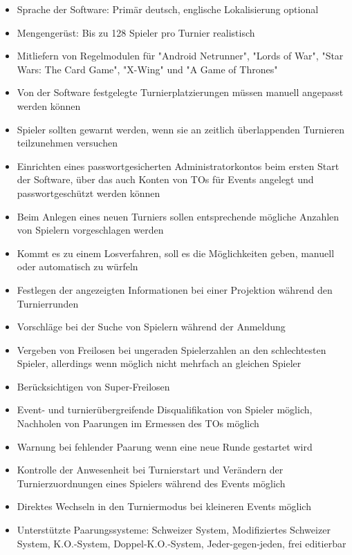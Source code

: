 \documentclass[11pt]{article}
\begin{document}
\begin{itemize}
	\item Sprache der Software: Primär deutsch, englische Lokalisierung optional
	\item Mengengerüst: Bis zu 128 Spieler pro Turnier realistisch
	\item Mitliefern von Regelmodulen für "Android Netrunner", "Lords of War", "Star Wars: The Card Game", "X-Wing" und "A Game of Thrones"
	\item Von der Software festgelegte Turnierplatzierungen müssen manuell angepasst werden können
	\item Spieler sollten gewarnt werden, wenn sie an zeitlich überlappenden Turnieren teilzunehmen versuchen
	\item Einrichten eines passwortgesicherten Administratorkontos beim ersten Start der Software, über das auch Konten von TOs für Events angelegt und passwortgeschützt werden können
	\item Beim Anlegen eines neuen Turniers sollen entsprechende mögliche Anzahlen von Spielern vorgeschlagen werden
	\item Kommt es zu einem Losverfahren, soll es die Möglichkeiten geben, manuell oder automatisch zu würfeln
	\item Festlegen der angezeigten Informationen bei einer Projektion während den Turnierrunden
	\item Vorschläge bei der Suche von Spielern während der Anmeldung
	\item Vergeben von Freilosen bei ungeraden Spielerzahlen an den schlechtesten Spieler, allerdings wenn möglich nicht mehrfach an gleichen Spieler
	\item Berücksichtigen von Super-Freilosen
	\item Event- und turnierübergreifende Disqualifikation von Spieler möglich, Nachholen von Paarungen im Ermessen des TOs möglich
	\item Warnung bei fehlender Paarung wenn eine neue Runde gestartet wird
	\item Kontrolle der Anwesenheit bei Turnierstart und Verändern der Turnierzuordnungen eines Spielers während des Events möglich
	\item Direktes Wechseln in den Turniermodus bei kleineren Events möglich
	\item Unterstützte Paarungssysteme: Schweizer System, Modifiziertes Schweizer System, K.O.-System, Doppel-K.O.-System, Jeder-gegen-jeden, frei editierbar
\end{itemize}
\end{document}
